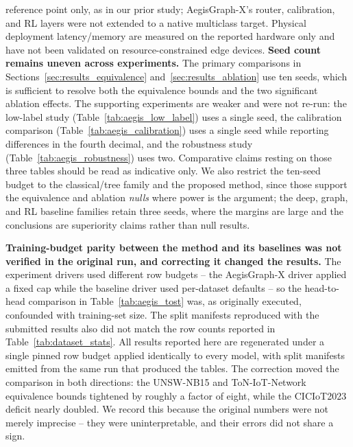 \documentclass[journal]{IEEEtran}
\begin{document}
reference point only, as in our prior study; AegisGraph-X's router,
calibration, and RL layers were not extended to a native multiclass target.
Physical deployment latency/memory are measured on the reported hardware
only and have not been validated on resource-constrained edge devices.
\textbf{Seed count remains uneven across experiments.} The primary
comparisons in Sections~\ref{sec:results_equivalence}
and~\ref{sec:results_ablation} use ten seeds, which is sufficient to resolve
both the equivalence bounds and the two significant ablation effects. The
supporting experiments are weaker and were not re-run: the low-label study
(Table~\ref{tab:aegis_low_label}) uses a single seed, the calibration
comparison (Table~\ref{tab:aegis_calibration}) uses a single seed while
reporting differences in the fourth decimal, and the robustness study
(Table~\ref{tab:aegis_robustness}) uses two. Comparative claims resting on
those three tables should be read as indicative only. We also restrict the
ten-seed budget to the classical/tree family and the proposed method, since
those support the equivalence and ablation \emph{nulls} where power is the
argument; the deep, graph, and RL baseline families retain three seeds,
where the margins are large and the conclusions are superiority claims
rather than null results.

\textbf{Training-budget parity between the method and its baselines was not
verified in the original run, and correcting it changed the results.} The
experiment drivers used different row budgets -- the AegisGraph-X driver
applied a fixed cap while the baseline driver used per-dataset defaults --
so the head-to-head comparison in Table~\ref{tab:aegis_tost} was, as
originally executed, confounded with training-set size. The split manifests
reproduced with the submitted results also did not match the row counts
reported in Table~\ref{tab:dataset_stats}. All results reported here are
regenerated under a single pinned row budget applied identically to every
model, with split manifests emitted from the same run that produced the
tables. The correction moved the comparison in both directions: the
UNSW-NB15 and ToN-IoT-Network equivalence bounds tightened by roughly a
factor of eight, while the CICIoT2023 deficit nearly doubled. We record this
because the original numbers were not merely imprecise -- they were
uninterpretable, and their errors did not share a sign.
\end{document}
